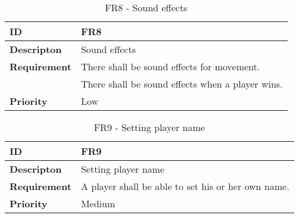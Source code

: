 
\begin{table}[h!]
\begin{tabular}{ | p{90pt} | p{270pt}  |}
\hline
\bf ID &  FR8  \\ \hline
\bf Descripton & Sound effects \\ \hline 
\bf Requirement & There shall be sound effects for movement. \\
& There shall be sound effects when a player wins. \\ \hline
\bf Priority & Low \\ \hline

\end{tabular}

\caption{FR8 - Sound effects}

\end{table}

\newpage


\begin{table}[h!]
\begin{tabular}{ | p{90pt} | p{270pt}  |}
\hline
\bf ID &  FR9 \\ \hline
\bf Descripton & Setting player name \\ \hline 
\bf Requirement & A player shall be able to set his or her own name.  \\ \hline
\bf Priority & Medium \\ \hline

\end{tabular}

\caption{FR9 - Setting player name}

\end{table}


